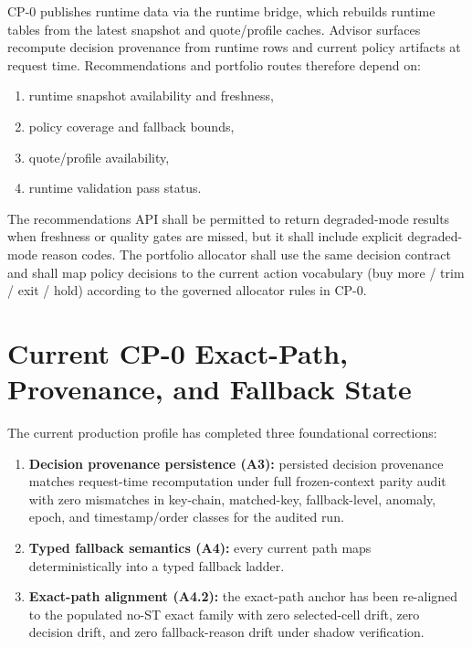 CP-0 publishes runtime data via the runtime bridge, which rebuilds runtime tables from the latest snapshot and quote/profile caches. Advisor surfaces recompute decision provenance from runtime rows and current policy artifacts at request time. Recommendations and portfolio routes therefore depend on:
\begin{enumerate}[leftmargin=1.2cm]
    \item runtime snapshot availability and freshness,
    \item policy coverage and fallback bounds,
    \item quote/profile availability,
    \item runtime validation pass status.
\end{enumerate}

The recommendations API shall be permitted to return degraded-mode results when freshness or quality gates are missed, but it shall include explicit degraded-mode reason codes. The portfolio allocator shall use the same decision contract and shall map policy decisions to the current action vocabulary (buy more / trim / exit / hold) according to the governed allocator rules in CP-0.

\section{Current CP-0 Exact-Path, Provenance, and Fallback State}

The current production profile has completed three foundational corrections:
\begin{enumerate}[leftmargin=1.2cm]
    \item \textbf{Decision provenance persistence (A3):} persisted decision provenance matches request-time recomputation under full frozen-context parity audit with zero mismatches in key-chain, matched-key, fallback-level, anomaly, epoch, and timestamp/order classes for the audited run.
    \item \textbf{Typed fallback semantics (A4):} every current path maps deterministically into a typed fallback ladder.
    \item \textbf{Exact-path alignment (A4.2):} the exact-path anchor has been re-aligned to the populated no-ST exact family with zero selected-cell drift, zero decision drift, and zero fallback-reason drift under shadow verification.
\end{enumerate}

